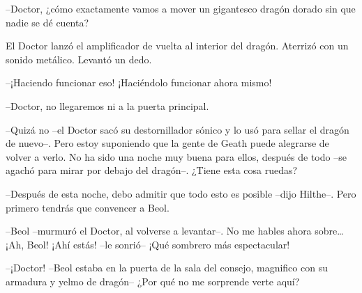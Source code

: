 {--Doctor, ¿cómo exactamente vamos a mover un gigantesco dragón dorado
sin que nadie se dé cuenta?}

{El Doctor lanzó el amplificador de vuelta al interior del dragón.
Aterrizó con un sonido metálico. Levantó un dedo.}

{--¡Haciendo funcionar eso! ¡Haciéndolo funcionar ahora mismo!}

{--Doctor, no llegaremos ni a la puerta principal.}

{--Quizá no --el Doctor sacó su destornillador sónico y lo usó para
	sellar el dragón de nuevo--. Pero estoy suponiendo que la gente de Geath
	puede alegrarse de volver a verlo. No ha sido una noche muy buena para
	ellos, después de todo --se agachó para mirar por debajo del dragón--.
¿Tiene esta cosa ruedas?}

{--Después de esta noche, debo admitir que todo esto es posible --dijo
Hilthe--. Pero primero tendrás que convencer a Beol.}

{--Beol --murmuró el Doctor, al volverse a levantar--. No me hables
	ahora sobre\ldots{} ¡Ah, Beol! ¡Ahí estás! --le sonrió-- ¡Qué sombrero
más espectacular!}

{--¡Doctor! --Beol estaba en la puerta de la sala del consejo,
	magnifico con su armadura y yelmo de dragón-- ¿Por qué no me sorprende
verte aquí?}
